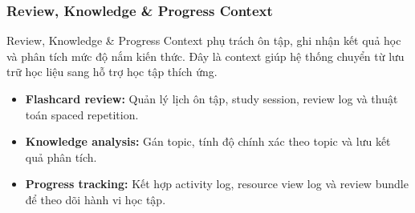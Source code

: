 \subsubsection{Review, Knowledge \& Progress Context}
\label{subsubsec:review-progress-context}

Review, Knowledge \& Progress Context phụ trách ôn tập, ghi nhận kết quả học và phân tích mức độ nắm kiến thức. Đây là context giúp hệ thống chuyển từ lưu trữ học liệu sang hỗ trợ học tập thích ứng.

\begin{itemize}
    \item \textbf{Flashcard review:} Quản lý lịch ôn tập, study session, review log và thuật toán spaced repetition.
    \item \textbf{Knowledge analysis:} Gán topic, tính độ chính xác theo topic và lưu kết quả phân tích.
    \item \textbf{Progress tracking:} Kết hợp activity log, resource view log và review bundle để theo dõi hành vi học tập.
\end{itemize}